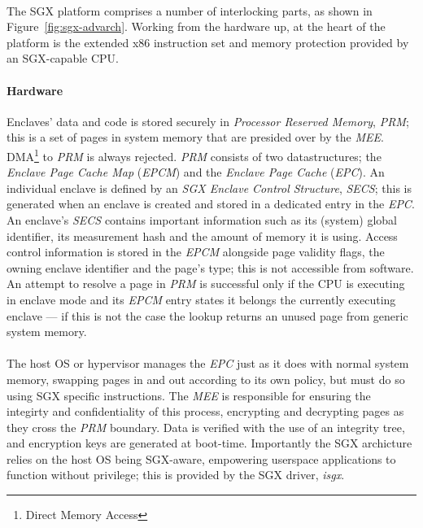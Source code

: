 \paragraph{} The SGX platform comprises a number of interlocking parts, as shown in Figure~\ref{fig:sgx-advarch}. Working from the hardware up, at the heart of the platform is the extended x86 instruction set and memory protection provided by an SGX-capable CPU. 

\paragraph{Hardware} Enclaves' data and code is stored securely in \textit{Processor Reserved Memory}, \textit{PRM}; this is a set of pages in system memory that are presided over by the \textit{MEE}. DMA\footnote{Direct Memory Access} to \textit{PRM} is always rejected. \textit{PRM} consists of two datastructures; the \textit{Enclave Page Cache Map} (\textit{EPCM}) and the \textit{Enclave Page Cache} (\textit{EPC}). An individual enclave is defined by an \textit{SGX Enclave Control Structure}, \textit{SECS}; this is generated when an enclave is created and stored in a dedicated entry in the \textit{EPC}. An enclave's \textit{SECS} contains important information such as its (system) global identifier, its measurement hash and the amount of memory it is using. Access control information is stored in the \textit{EPCM} alongside page validity flags, the owning enclave identifier and the page's type; this is not accessible from software. An attempt to resolve a page in \textit{PRM} is successful only if the CPU is executing in enclave mode and its \textit{EPCM} entry states it belongs the currently executing enclave --- if this is not the case the lookup returns an unused page from generic system memory.

\paragraph{} The host OS or hypervisor manages the \textit{EPC} just as it does with normal system memory, swapping pages in and out according to its own policy, but must do so using SGX specific instructions. The \textit{MEE} is responsible for ensuring the integirty and confidentiality of this process, encrypting and decrypting pages as they cross the \textit{PRM} boundary. Data is verified with the use of an integrity tree, and encryption keys are generated at boot-time. Importantly the SGX archicture relies on the host OS being SGX-aware, empowering userspace applications to function without privilege; this is provided by the SGX driver, \textit{isgx}.


